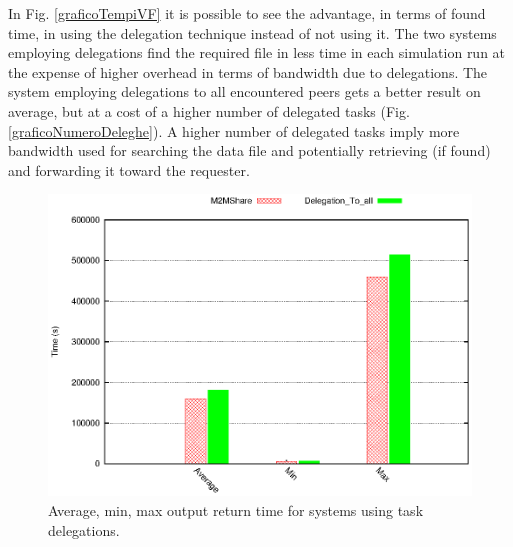 In Fig. \ref{graficoTempiVF} it is possible to see the advantage, in terms of found time, in using the delegation technique instead of not using it. The two systems employing delegations find the required file in less time in each simulation run at the expense of higher overhead in terms of bandwidth due to delegations. The system employing delegations to all encountered peers gets a better result on average, but at a cost of a higher number of delegated tasks (Fig. \ref{graficoNumeroDeleghe}). A higher number of delegated tasks imply more bandwidth used for searching the data file and potentially retrieving (if found) and forwarding it toward the requester.
\\

\begin{figure}[ht]
\begin{minipage}[b]{1\linewidth}
\centering
\includegraphics[scale=0.5]{grafici/tempiRitornoDeleghe.eps}
\caption{Average, min, max output return time for systems using task delegations.}
\label{graficoRitornoMedioDeleghe}
\end{minipage}
\end{figure}


